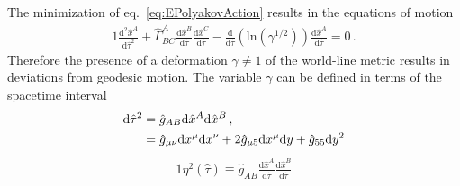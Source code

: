 The minimization of eq.~\eqref{eq:EPolyakovAction} results in the equations of motion
\begin{alignat}{1}
	\label{eq:EParticleMotion} \frac{\mathrm{d}^{2}\hat{x}^{A}}{\mathrm{d}\hat{\tau}^{2}}+\hat{\Gamma}^{A}_{BC}\frac{\mathrm{d}\hat{x}^{B}}{\mathrm{d}\hat{\tau}}\frac{\mathrm{d}\hat{x}^{C}}{\mathrm{d}\hat{\tau}}-\frac{\mathrm{d}}{\mathrm{d}\hat{\tau}}\left(\mathrm{ln}\left(\gamma^{1/2}\right)\right)\frac{\mathrm{d}\hat{x}^{A}}{\mathrm{d}\hat{\tau}}=0\,.
\end{alignat}
Therefore the presence of a deformation $\gamma\neq1$ of the world-line metric results in deviations from geodesic motion. The variable $\gamma$ can be defined in terms of the spacetime interval
\begin{alignat}{1}
	\label{eq:EInterval}\mathrm{d}\hat{\tau}^{2}&=\hat{g}_{AB}\mathrm{d}\hat{x}^{A}\mathrm{d}\hat{x}^{B}\,,\\
	\notag&=\hat{g}_{\mu\nu}\mathrm{d}x^{\mu}\mathrm{d}x^{\nu}+2\hat{g}_{\mu5}\mathrm{d}x^{\mu}\mathrm{d}y+\hat{g}_{55}\mathrm{d}y^{2}
\end{alignat}
\begin{alignat}{1}
	\label{eq:EInducedMetric}\eta^{2}(\hat{\tau})\equiv\hat{g}_{AB}\frac{\mathrm{d}\hat{x}^{A}}{\mathrm{d}\hat{\tau}}\frac{\mathrm{d}\hat{x}^{B}}{\mathrm{d}\hat{\tau}}
\end{alignat}
